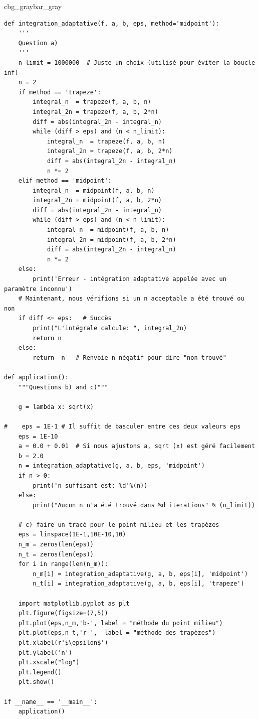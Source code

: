 \documentclass[%
oneside,                 %
final,                   %
10pt,french]{article}
\newenvironment{_pro_tight}[2]{
   \def\FrameCommand{\color{#2}\vrule width 1mm\normalcolor\colorbox{#1}}
   \FrameRule0.6pt\MakeFramed {\advance\hsize-2mm\FrameRestore}\vskip3mm}
   {\vskip0mm\endMakeFramed}
\newenvironment{pro}[2]{
\bgroup\rmfamily
\fboxsep=0mm\relax
\begin{_pro_tight}{#1}{#2}
\list{}{\parsep=-2mm\parskip=0mm\topsep=0pt\leftmargin=2mm
\rightmargin=2\leftmargin\leftmargin=4pt\relax}
\item\relax}
{\endlist\end{_pro_tight}\egroup}
\newenvironment{doconceexercise}{}{}
\begin{document}
\begin{doconceexercise}
\begin{pro}{cbg_gray}{bar_gray}
\begin{verbatim}
def integration_adaptative(f, a, b, eps, method='midpoint'):
    '''
    Question a)
    '''
    n_limit = 1000000  # Juste un choix (utilisé pour éviter la boucle inf)
    n = 2
    if method == 'trapeze':
        integral_n  = trapeze(f, a, b, n)
        integral_2n = trapeze(f, a, b, 2*n)
        diff = abs(integral_2n - integral_n)
        while (diff > eps) and (n < n_limit):
            integral_n  = trapeze(f, a, b, n)
            integral_2n = trapeze(f, a, b, 2*n)
            diff = abs(integral_2n - integral_n)
            n *= 2
    elif method == 'midpoint':
        integral_n  = midpoint(f, a, b, n)
        integral_2n = midpoint(f, a, b, 2*n)
        diff = abs(integral_2n - integral_n)
        while (diff > eps) and (n < n_limit):
            integral_n  = midpoint(f, a, b, n)
            integral_2n = midpoint(f, a, b, 2*n)
            diff = abs(integral_2n - integral_n)
            n *= 2
    else:
        print('Erreur - intégration adaptative appelée avec un paramètre inconnu')
    # Maintenant, nous vérifions si un n acceptable a été trouvé ou non
    if diff <= eps:   # Succès
        print("L'intégrale calcule: ", integral_2n)
        return n
    else:
        return -n   # Renvoie n négatif pour dire "non trouvé"

def application():
    """Questions b) and c)"""

    g = lambda x: sqrt(x)

#    eps = 1E-1 # Il suffit de basculer entre ces deux valeurs eps
    eps = 1E-10
    a = 0.0 + 0.01  # Si nous ajustons a, sqrt (x) est géré facilement
    b = 2.0
    n = integration_adaptative(g, a, b, eps, 'midpoint')
    if n > 0:
        print('n suffisant est: %d'%(n))
    else:
        print("Aucun n n'a été trouvé dans %d iterations" % (n_limit))
   
    # c) faire un tracé pour le point milieu et les trapèzes
    eps = linspace(1E-1,10E-10,10)
    n_m = zeros(len(eps))
    n_t = zeros(len(eps))
    for i in range(len(n_m)):
        n_m[i] = integration_adaptative(g, a, b, eps[i], 'midpoint')
        n_t[i] = integration_adaptative(g, a, b, eps[i], 'trapeze')

    import matplotlib.pyplot as plt
    plt.figure(figsize=(7,5))
    plt.plot(eps,n_m,'b-', label = "méthode du point milieu")
    plt.plot(eps,n_t,'r-',  label = "méthode des trapèzes")
    plt.xlabel(r'$\epsilon$')
    plt.ylabel('n')
    plt.xscale("log")
    plt.legend()
    plt.show()

if __name__ == '__main__':
    application()
\end{verbatim}
\end{pro}
\noindent


\end{doconceexercise}
\end{document}
